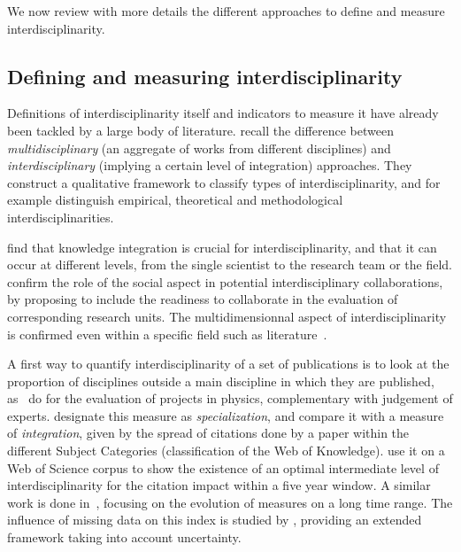 We now review with more details the different approaches to define and measure interdisciplinarity.


\subsection*{Defining and measuring interdisciplinarity}

Definitions of interdisciplinarity itself and indicators to measure it have already been tackled by a large body of literature. \cite{huutoniemi2010analyzing} recall the difference between \emph{multidisciplinary} (an aggregate of works from different disciplines) and \emph{interdisciplinary} (implying a certain level of integration) approaches. They construct a qualitative framework to classify types of interdisciplinarity, and for example distinguish empirical, theoretical and methodological interdisciplinarities.


\cite{wagner2011approaches} find that knowledge integration is crucial for interdisciplinarity, and that it can occur at different levels, from the single scientist to the research team or the field. \cite{hall2008collaboration} confirm the role of the social aspect in potential interdisciplinary collaborations, by proposing to include the readiness to collaborate in the evaluation of corresponding research units. The multidimensionnal aspect of interdisciplinarity is confirmed even within a specific field such as literature~\citep{austin1996defining}.

 A first way to quantify interdisciplinarity of a set of publications is to look at the proportion of disciplines outside a main discipline in which they are published, as~\cite{rinia2002impact} do for the evaluation of projects in physics, complementary with judgement of experts. \cite{porter2007measuring} designate this measure as \emph{specialization}, and compare it with a measure of \emph{integration}, given by the spread of citations done by a paper within the different Subject Categories (classification of the Web of Knowledge). \cite{lariviere2010relationship} use it on a Web of Science corpus to show the existence of an optimal intermediate level of interdisciplinarity for the citation impact within a five year window. A similar work is done in~\citep{lariviere201410}, focusing on the evolution of measures on a long time range. The influence of missing data on this index is studied by \cite{moreno2016uncertainty}, providing an extended framework taking into account uncertainty.


